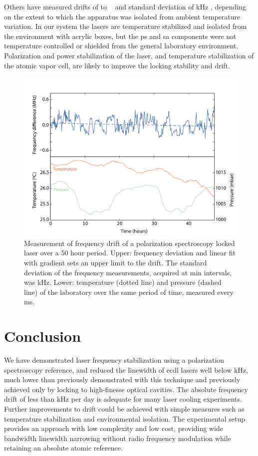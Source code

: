 Others have measured drifts of  to ~\cite{yoshikawa_frequency_2003, tiwari_laser_2006} and standard deviation of \unit[400]{kHz} \cite{lee_frequency_2014}, depending on the extent to which the apparatus was isolated from ambient temperature variation.
In our system the lasers are temperature stabilized and isolated from the environment with acrylic boxes, but the \gls*{ps} and \gls*{sa} components were not temperature controlled or shielded from the general laboratory environment.
Polarization and power stabilization of the laser, and temperature stabilization of the atomic vapor cell, are likely to improve the locking stability and drift.

\begin{figure}[htbp]
\centering
\includegraphics[width=\linewidth]{part1/Figs/fig6_v1.pdf}
\caption{Measurement of frequency drift of a polarization spectroscopy locked laser over a 50 hour period.
Upper: frequency deviation and linear fit with gradient  sets an upper limit to the drift.
The standard deviation of the frequency measurements, acquired at \unit[5]{min} intervals, was \unit[155]{kHz}.
Lower: temperature (dotted line) and pressure (dashed line) of the laboratory over the same period of time, measured every \unit[200]{ms}.}
\label{drift}
\end{figure}

\chapter{Conclusion}
We have demonstrated laser frequency stabilization using a polarization spectroscopy reference, and reduced the linewidth of \gls*{ecdl} lasers well below \unit[1]{kHz}, much lower than previously demonstrated with this technique and previously achieved only by locking to high-finesse optical cavities.
The absolute frequency drift of less than \unit[50]{kHz} per day is adequate for many laser cooling experiments.
Further improvements to drift could be achieved with simple measures such as temperature stabilization and environmental isolation.
The experimental setup provides an approach with low complexity and low cost, providing wide bandwidth linewidth narrowing without radio frequency modulation while retaining an absolute atomic reference.

